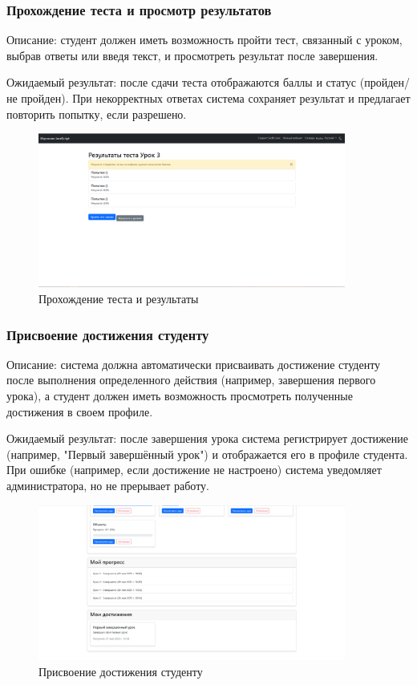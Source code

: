 \subsubsection{Прохождение теста и просмотр результатов}
	
Описание: студент должен иметь возможность пройти тест, связанный с уроком, выбрав ответы или введя текст, и просмотреть результат после завершения.
	
Ожидаемый результат: после сдачи теста отображаются баллы и статус (пройден/не пройден). При некорректных ответах система сохраняет результат и предлагает повторить попытку, если разрешено.
	
	\begin{figure}[ht]
		\centering
		\includegraphics[width=0.9\textwidth]{images/тестрез} 
		\caption{Прохождение теста и результаты}
		\label{test:image}
	\end{figure}
	
\subsubsection{Присвоение достижения студенту}
	
Описание: система должна автоматически присваивать достижение студенту после выполнения определенного действия (например, завершения первого урока), а студент должен иметь возможность просмотреть полученные достижения в своем профиле.
	
Ожидаемый результат: после завершения урока система регистрирует достижение (например, "Первый завершённый урок") и отображается его в профиле студента. При ошибке (например, если достижение не настроено) система уведомляет администратора, но не прерывает работу.
	
	\begin{figure}[ht]
		\centering
		\includegraphics[width=0.9\textwidth]{images/достижение} 
		\caption{Присвоение достижения студенту}
		\label{achiv:image}
	\end{figure}
	
